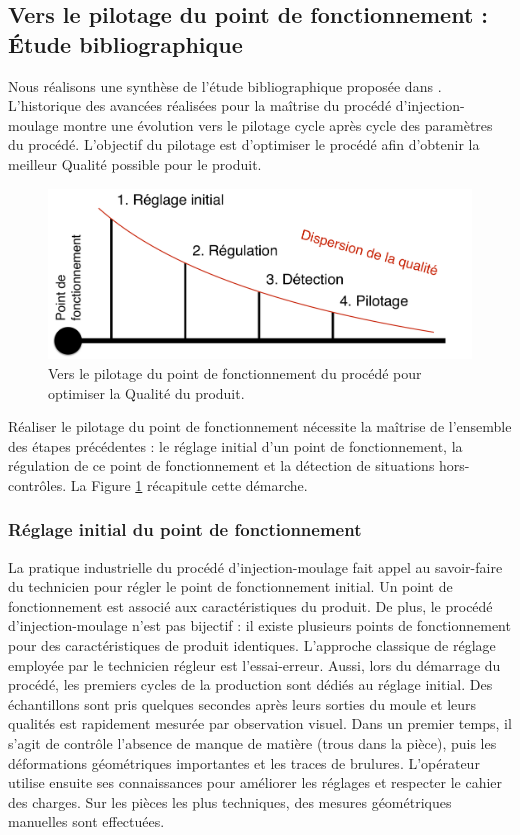 \subsection{Vers le pilotage du point de fonctionnement : Étude bibliographique}
Nous réalisons une synthèse de l'étude bibliographique proposée dans \cite{nagorny_injection_2017}.
L'historique des avancées réalisées pour la maîtrise du procédé d'injection-moulage montre une évolution vers le pilotage cycle après cycle des paramètres du procédé.
L'objectif du pilotage est d'optimiser le procédé afin d'obtenir la meilleur Qualité possible pour le produit.
\begin{figure}[hbtp]
	\centering
	\includegraphics[width=\textwidth,height=\textheight,keepaspectratio]{../Chap1/Figures/Sapristi_EtatArt_Pilotage_en_Injection_Plastique.pdf}
	\caption{Vers le pilotage du point de fonctionnement du procédé pour optimiser la Qualité du produit.}
	\label{fig:vers_le_pilotage}
\end{figure}
Réaliser le pilotage du point de fonctionnement nécessite la maîtrise de l'ensemble des étapes précédentes : le réglage initial d'un point de fonctionnement, la régulation de ce point de fonctionnement et la détection de situations hors-contrôles.
La Figure \ref{fig:vers_le_pilotage} récapitule cette démarche.

\subsubsection{Réglage initial du point de fonctionnement}
La pratique industrielle du procédé d'injection-moulage fait appel au savoir-faire du technicien pour régler le point de fonctionnement initial.
Un point de fonctionnement est associé aux caractéristiques du produit.
De plus, le procédé d'injection-moulage n'est pas bijectif : il existe plusieurs points de fonctionnement pour des caractéristiques de produit identiques.
L’approche classique de réglage employée par le technicien régleur est l’essai-erreur.
Aussi, lors du démarrage du procédé, les premiers cycles de la production sont dédiés au réglage initial.
Des échantillons sont pris quelques secondes après leurs sorties du moule et leurs qualités est rapidement mesurée par observation visuel.
Dans un premier temps, il s'agit de contrôle l'absence de manque de matière (trous dans la pièce), puis les déformations géométriques importantes et les traces de brulures.
L’opérateur utilise ensuite ses connaissances pour améliorer les réglages et respecter le cahier des charges.
Sur les pièces les plus techniques, des mesures géométriques manuelles sont effectuées.

